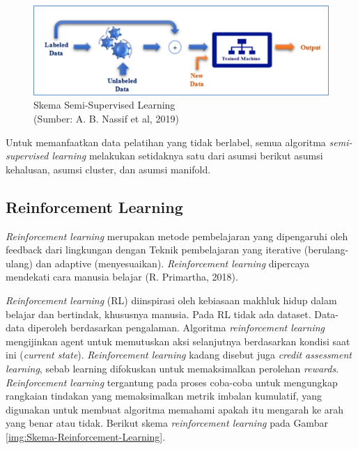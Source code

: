 \begin{figure}[H]
	\vspace{-0.1cm}
	\begin{center}
		\includegraphics[width=1\columnwidth]{bab2/Gambar/Picture10.png}
	\end{center}
	\vspace{-0.2cm}
	\captionsetup{justification=centering}
	\caption{Skema Semi-Supervised Learning\\(Sumber: A. B. Nassif et al, 2019)}\label{img:Skema-Semi-Supervised-Learning}
\end{figure}

Untuk memanfaatkan data pelatihan yang tidak berlabel, semua algoritma \textit{semi-supervised learning} melakukan setidaknya satu dari asumsi berikut asumsi kehalusan, asumsi cluster, dan asumsi manifold.

\subsection{Reinforcement Learning}
\hspace{1,2cm}\textit{Reinforcement learning} merupakan metode pembelajaran yang dipengaruhi oleh feedback dari lingkungan dengan Teknik pembelajaran yang iterative (berulang-ulang) dan adaptive (menyesuaikan). \textit{Reinforcement learning} dipercaya mendekati cara manusia belajar (R. Primartha, 2018). 

\textit{Reinforcement learning} (RL) diinspirasi oleh kebiasaan makhluk hidup dalam belajar dan bertindak, khususnya manusia. Pada RL tidak ada dataset. Data-data diperoleh berdasarkan pengalaman. Algoritma \textit{reinforcement learning} mengijinkan agent untuk memutuskan aksi selanjutnya berdasarkan kondisi saat ini (\textit{current state}). \textit{Reinforcement learning} kadang disebut juga \textit{credit assessment learning}, sebab learning difokuskan untuk memaksimalkan perolehan \textit{rewards}. \textit{Reinforcement learning} tergantung pada proses coba-coba untuk mengungkap rangkaian tindakan yang memaksimalkan metrik imbalan kumulatif, yang digunakan untuk membuat algoritma memahami apakah itu mengarah ke arah yang benar atau tidak. Berikut skema \textit{reinforcement learning} pada Gambar \ref{img:Skema-Reinforcement-Learning}. 

